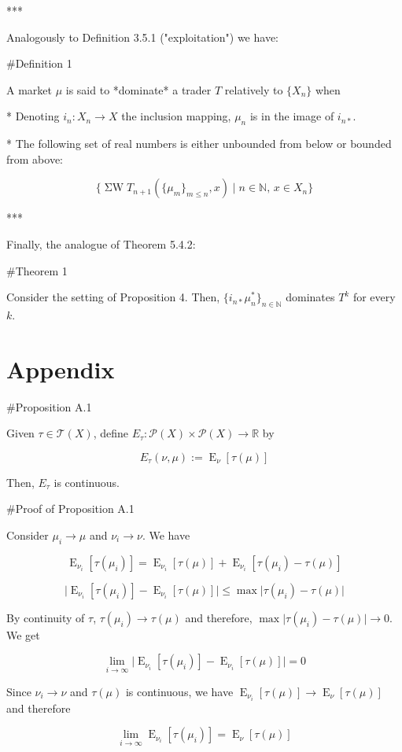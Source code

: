 \documentclass[a4paper]{article}
\DeclareMathOperator{\E}{E}
\newcommand{\Nats}{\mathbb{N}}
\newcommand{\Reals}{\mathbb{R}}
\newcommand{\Abs}[1]{\lvert #1 \rvert}
\newcommand{\Prob}{\mathcal{P}}
\newcommand{\T}{\mathcal{T}(X)}
\newcommand{\SW}{\operatorname{\Sigma W}}
\begin{document}
***

Analogously to Definition 3.5.1 ("exploitation") we have:

\#Definition 1

A market ${\mu}$ is said to *dominate* a trader ${T}$ relatively to ${\{X_n\}}$ when

* Denoting ${i_n: X_n \rightarrow X}$ the inclusion mapping, ${\mu_n}$ is in the image of ${i_{n*}}$.

* The following set of real numbers is either unbounded from below or bounded from above:

$$\{\SW T_{n+1}(\{\mu_m\}_{m \leq n},x) \mid n \in \Nats,\, x \in X_n\}$$

***

Finally, the analogue of Theorem 5.4.2:

\#Theorem 1

Consider the setting of Proposition 4. Then, ${\{i_{n*}\mu^*_n\}_{n \in \Nats}}$ dominates ${T^k}$ for every ${k}$.

\section{Appendix}

\#Proposition A.1

Given ${\tau \in \T}$, define ${E_\tau: \Prob(X) \times \Prob(X) \rightarrow \Reals}$ by

$$E_\tau(\nu,\mu):=\E_\nu[\tau(\mu)]$$

Then, ${E_\tau}$ is continuous.

\#Proof of Proposition A.1

Consider ${\mu_i \rightarrow \mu}$ and ${\nu_i \rightarrow \nu}$. We have

$$\E_{\nu_i}[\tau(\mu_i)] = \E_{\nu_i}[\tau(\mu)] + \E_{\nu_i}[\tau(\mu_i) - \tau(\mu)]$$

$$\Abs{\E_{\nu_i}[\tau(\mu_i)] - \E_{\nu_i}[\tau(\mu)]} \leq \max\Abs{\tau(\mu_i) - \tau(\mu)}$$

By continuity of ${\tau}$, ${\tau(\mu_i) \rightarrow \tau(\mu)}$ and therefore, $\max\Abs{\tau(\mu_i) - \tau(\mu)} \rightarrow 0$. We get

$$\lim_{i \rightarrow \infty} \Abs{\E_{\nu_i}[\tau(\mu_i)] - \E_{\nu_i}[\tau(\mu)]} = 0$$

Since ${\nu_i \rightarrow \nu}$ and ${\tau(\mu)}$ is continuous, we have ${\E_{\nu_i}[\tau(\mu)] \rightarrow \E_{\nu}[\tau(\mu)]}$ and therefore

$$\lim_{i \rightarrow \infty} \E_{\nu_i}[\tau(\mu_i)] = \E_{\nu}[\tau(\mu)]$$
\end{document}
